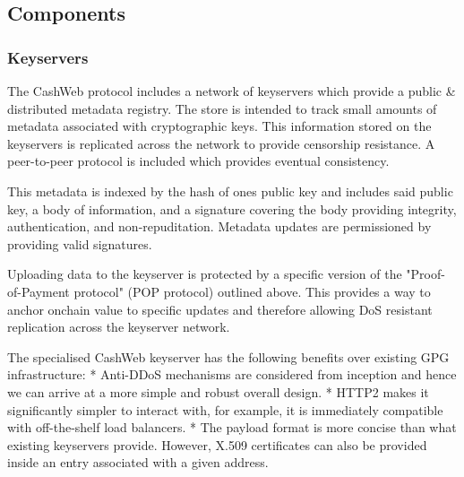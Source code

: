 \documentclass{article}
\begin{document}
\subsection{Components}

\subsubsection{Keyservers}

The CashWeb protocol includes a network of keyservers which provide a public \& distributed metadata registry. The store is intended to track small amounts of metadata associated with cryptographic keys. This information stored on the keyservers is replicated across the network to provide censorship resistance. A peer-to-peer protocol is included which provides eventual consistency.

This metadata is indexed by the hash of ones public key and includes said public key, a body of information, and a signature covering the body providing integrity, authentication, and non-repuditation. Metadata updates are permissioned by providing valid signatures.



Uploading data to the keyserver is protected by a specific version of the "Proof-of-Payment protocol" (POP protocol) outlined above. This provides a way to anchor onchain value to specific updates and therefore allowing DoS resistant replication across the keyserver network.

The specialised CashWeb keyserver has the following benefits over existing GPG infrastructure:
* Anti-DDoS mechanisms are considered from inception and hence we can arrive at a more simple and robust overall design.
* HTTP2 makes it significantly simpler to interact with, for example, it is immediately compatible with off-the-shelf load balancers.
* The payload format is more concise than what existing keyservers provide. However, X.509 certificates can also be provided inside an entry associated with a given address.
\end{document}

